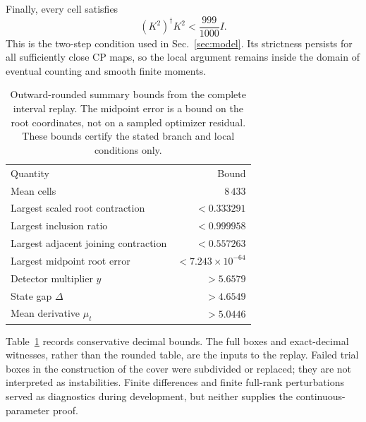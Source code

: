 \documentclass[aps,pra,reprint,amsmath,amssymb,longbibliography]{revtex4-2}
\begin{document}
Finally, every cell satisfies
\begin{equation}
 (K^2)^\dagger K^2<\frac{999}{1000}I.\label{eq:transience}
\end{equation}
This is the two-step condition used in Sec.~\ref{sec:model}. Its strictness persists for all sufficiently close CP maps, so the local argument remains inside the domain of eventual counting and smooth finite moments.

\begin{table}[t]
\caption{Outward-rounded summary bounds from the complete interval replay. The midpoint error is a bound on the root coordinates, not on a sampled optimizer residual. These bounds certify the stated branch and local conditions only.}
\label{tab:certificate}
\begin{ruledtabular}
\begin{tabular}{lr}
Quantity & Bound\\
Mean cells & $8\,433$\\
Largest scaled root contraction & $<0.333291$\\
Largest inclusion ratio & $<0.999958$\\
Largest adjacent joining contraction & $<0.557263$\\
Largest midpoint root error & $<7.243\times10^{-64}$\\
Detector multiplier $y$ & $>5.6579$\\
State gap $\Delta$ & $>4.6549$\\
Mean derivative $\mu_t$ & $>5.0446$\\
\end{tabular}
\end{ruledtabular}
\end{table}

Table~\ref{tab:certificate} records conservative decimal bounds. The full boxes and exact-decimal witnesses, rather than the rounded table, are the inputs to the replay. Failed trial boxes in the construction of the cover were subdivided or replaced; they are not interpreted as instabilities. Finite differences and finite full-rank perturbations served as diagnostics during development, but neither supplies the continuous-parameter proof.
\end{document}
